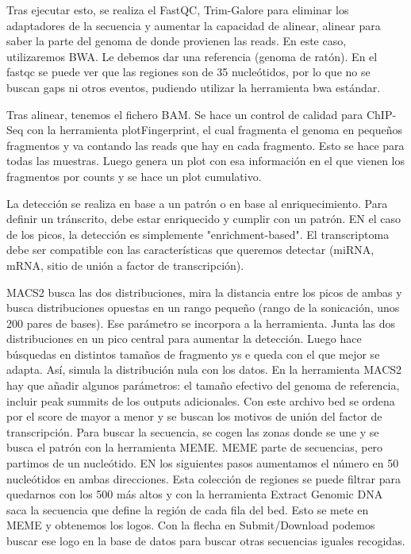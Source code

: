 Tras ejecutar esto, se realiza el FastQC, Trim-Galore para eliminar los adaptadores de la secuencia y aumentar la capacidad de alinear, alinear para saber la parte del genoma de donde provienen las reads. En este caso, utilizaremos BWA. Le debemos dar una referencia (genoma de ratón). En el fastqc se puede ver que las regiones son de 35 nucleótidos, por lo que no se buscan gaps ni otros eventos, pudiendo utilizar la herramienta bwa estándar. 

Tras alinear, tenemos el fichero BAM. Se hace un control de calidad para ChIP-Seq con la herramienta plotFingerprint, el cual fragmenta el genoma en pequeños fragmentos y va contando las reads que hay en cada fragmento. Esto se hace para todas las muestras. Luego genera un plot con esa información en el que vienen los fragmentos por counts y se hace un plot cumulativo. 

La detección se realiza en base a un patrón o en base al enriquecimiento. Para definir un tránscrito, debe estar enriquecido y cumplir con un patrón. EN el caso de los picos, la detección es simplemente "enrichment-based". El transcriptoma debe ser compatible con las características que queremos detectar (miRNA, mRNA, sitio de unión a factor de transcripción). 

MACS2 busca las dos distribuciones, mira la distancia entre los picos de ambas y busca distribuciones opuestas en un rango pequeño (rango de la sonicación, unos 200 pares de bases). Ese parámetro se incorpora a la herramienta. Junta las dos distribuciones en un pico central para aumentar la detección. Luego hace búsquedas en distintos tamaños de fragmento ys e queda con el que mejor se adapta. Así, simula la distribución nula con los datos. 
En la herramienta MACS2 hay que añadir algunos parámetros: el tamaño efectivo del genoma de referencia, incluir peak summits de los outputs adicionales. Con este archivo bed se ordena por el score de mayor a menor y se buscan los motivos de unión del factor de transcripción. Para buscar la secuencia, se cogen las zonas donde se une y se busca el patrón con la herramienta MEME. MEME parte de secuencias, pero partimos de un nucleótido. EN los siguientes pasos aumentamos el número en 50 nucleótidos en ambas direcciones. Esta colección de regiones se puede filtrar para quedarnos con los 500 más altos y con la herramienta Extract Genomic DNA saca la secuencia que define la región de cada fila del bed. Esto se mete en MEME y obtenemos los logos. Con la flecha en Submit/Download podemos buscar ese logo en la base de datos para buscar otras secuencias iguales recogidas. 